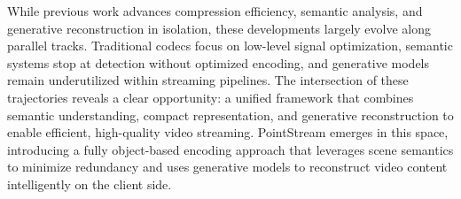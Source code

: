 \documentclass[manuscript, screen]{acmart}
\begin{document}
While previous work advances compression efficiency, semantic analysis, and generative reconstruction in isolation, these developments largely evolve along parallel tracks. Traditional codecs focus on low-level signal optimization, semantic systems stop at detection without optimized encoding, and generative models remain underutilized within streaming pipelines. The intersection of these trajectories reveals a clear opportunity: a unified framework that combines semantic understanding, compact representation, and generative reconstruction to enable efficient, high-quality video streaming. PointStream emerges in this space, introducing a fully object-based encoding approach that leverages scene semantics to minimize redundancy and uses generative models to reconstruct video content intelligently on the client side.


\end{document}
